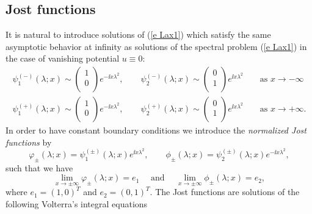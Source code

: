 \subsection{Jost functions}
It is natural to introduce solutions of (\ref{e Lax1}) which satisfy the same asymptotic behavior at infinity as solutions of the spectral problem (\ref{e Lax1}) in the case of vanishing potential $u\equiv 0$:
\begin{eqnarray*}
  \psi^{(-)}_1(\lambda;x)\sim
  \left(
    \begin{array}{c}
      1 \\
      0 \\
    \end{array}
  \right)e^{-\ii x\lambda^2}
  ,\qquad
  \psi^{(-)}_2(\lambda;x)\sim
  \left(
    \begin{array}{c}
      0 \\
      1 \\
    \end{array}
  \right)e^{\ii x\lambda^2}
  && \text{ as } x\to -\infty\\
  \psi^{(+)}_1(\lambda;x)\sim
  \left(
    \begin{array}{c}
      1 \\
      0 \\
    \end{array}
  \right)e^{-\ii x\lambda^2}
  ,\qquad
  \psi^{(+)}_2(\lambda;x)\sim
  \left(
    \begin{array}{c}
      0 \\
      1 \\
    \end{array}
  \right)e^{\ii x\lambda^2}
  && \text{ as } x\to+\infty.
\end{eqnarray*}
In order to have constant boundary conditions we introduce the \emph{normalized Jost functions} by
\begin{equation*}
    \varphi_{\pm}(\lambda;x)=\psi^{(\pm)}_1(\lambda;x) e^{\ii x\lambda^2},\qquad \phi_{\pm}(\lambda;x)=\psi^{(\pm)}_2(\lambda;x) e^{-\ii x\lambda^2},
\end{equation*}
such that we have
\begin{equation}\label{e asymptotics psi}
    \lim_{x\to\pm\infty}\varphi_{\pm}(\lambda;x)=e_1\quad\text{ and } \quad\lim_{x\to\pm\infty}\phi_{\pm}(\lambda;x)=e_2,
\end{equation}
where $e_1=(1,0)^T$ and $e_2=(0,1)^T$. The Jost functions are solutions of the following Volterra's integral equations
